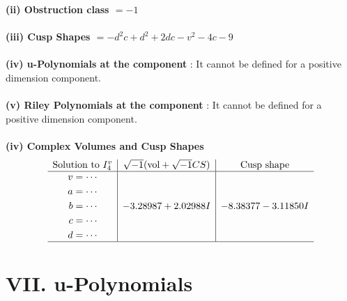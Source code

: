 \documentclass[1p]{elsarticle_modified}
\theoremstyle{definition}
\newcommand{\I}{\sqrt{-1}}
\begin{document}
\flushleft \textbf{(ii) Obstruction class $= -1$}\\~\\
\flushleft \textbf{(iii) Cusp Shapes $= - d^2 c+d^2+2 d c- v^2-4 c-9$}\\~\\
\flushleft \textbf{(iv) u-Polynomials at the component} : It cannot be defined for a positive dimension component.\\~\\
\flushleft \textbf{(v) Riley Polynomials at the component} : It cannot be defined for a positive dimension component.\\~\\
\newpage\flushleft \textbf{(iv) Complex Volumes and Cusp Shapes}
$$\begin{array}{c|c|c} 
\text{Solution to }I^v_{4}& \I (\text{vol} + \sqrt{-1}CS) & \text{Cusp shape}\\
 \hline 
\begin{aligned}
v &= \cdots \\
a &= \cdots \\
b &= \cdots \\
c &= \cdots \\
d &= \cdots\end{aligned}
 & -3.28987 + 2.02988 I & -8.38377 - 3.11850 I\\
 \hline 
 \end{array}
$$
\newpage\renewcommand{\arraystretch}{1}
\centering \section*{ VII. u-Polynomials}
\end{document}
